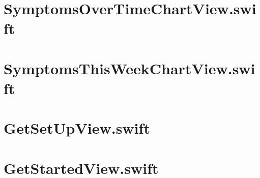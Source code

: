 \section{SymptomsOverTimeChartView.swift}


\section{SymptomsThisWeekChartView.swift}


\section{GetSetUpView.swift}


\section{GetStartedView.swift}


